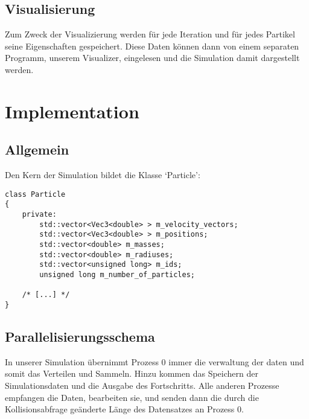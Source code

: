 \subsection{Visualisierung}
Zum Zweck der Visualizierung werden für jede Iteration und für jedes Partikel seine
Eigenschaften gespeichert. Diese Daten können dann von einem separaten Programm,
unserem Visualizer, eingelesen und die Simulation damit dargestellt werden.


\section{Implementation}
\subsection{Allgemein}
Den Kern der Simulation bildet die Klasse `Particle':
\begin{verbatim}
class Particle
{
    private:
        std::vector<Vec3<double> > m_velocity_vectors;
        std::vector<Vec3<double> > m_positions;
        std::vector<double> m_masses;
        std::vector<double> m_radiuses;
        std::vector<unsigned long> m_ids;
        unsigned long m_number_of_particles;

    /* [...] */
}
\end{verbatim}

\subsection{Parallelisierungsschema}
In unserer Simulation übernimmt Prozess 0 immer die verwaltung der daten und somit das Verteilen
und Sammeln. Hinzu kommen das Speichern der Simulationsdaten und die Ausgabe des Fortschritts.
Alle anderen Prozesse empfangen die Daten, bearbeiten sie, und senden dann die
durch die Kollisionsabfrage geänderte Länge des Datensatzes an Prozess 0.

\newpage


